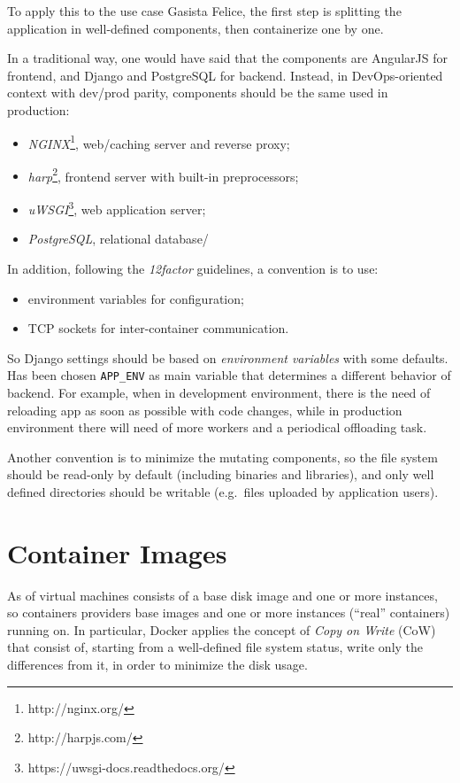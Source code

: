 To apply this to the use case Gasista Felice, the first step is splitting the application in well-defined components, then containerize one by one.

In a traditional way, one would have said that the components are AngularJS for frontend, and Django and PostgreSQL for backend. Instead, in DevOps-oriented context with dev/prod parity, components should be the same used in production:
\begin{itemize}

\item
  \textit{NGINX}\footnote{http://nginx.org/}, web/caching server and reverse proxy;
\item
  \textit{harp}\footnote{http://harpjs.com/}, frontend server with built-in preprocessors;
\item
  \textit{uWSGI}\footnote{https://uwsgi-docs.readthedocs.org/}, web application server;
\item
  \textit{PostgreSQL}, relational database/
\end{itemize}

In addition, following the \textit{12factor} guidelines, a convention is to use:
\begin{itemize}

\item
  environment variables for configuration;
\item
  TCP sockets for inter-container communication.
\end{itemize}

So Django settings should be based on \textit{environment variables} with
some defaults. Has been chosen \texttt{APP\_ENV} as main variable that
determines a different behavior of backend. For example, when in
development environment, there is the need of reloading app as soon as
possible with code changes, while in production environment there will
need of more workers and a periodical offloading task.

Another convention is to minimize the mutating components, so the file
system should be read-only by default (including binaries and
libraries), and only well defined directories should be writable
(e.g.~files uploaded by application users).

\section{Container Images}\label{container-images}

As of virtual machines consists of a base disk image and one or more
instances, so containers providers base images and one or more instances
(``real'' containers) running on. In particular, Docker applies the
concept of \textit{Copy on Write} (CoW) that consist of, starting from a
well-defined file system status, write only the differences from it, in
order to minimize the disk usage.

